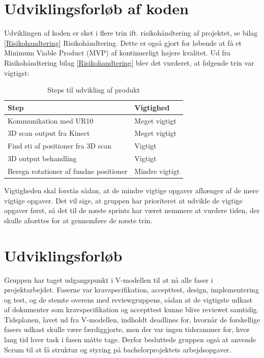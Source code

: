 \newpage

\section{Udviklingsforløb af koden}
Udviklingen af koden er sket i flere trin ift. risikohåndtering af projektet, se bilag \ref{Risikohandtering} Risikohåndtering. Dette er også gjort for løbende at få et Minimum Viable Product (MVP) af kontinuerligt højere kvalitet. 
Ud fra Risikohåndtering bilag \ref{Risikohandtering} blev det vurderet, at følgende trin var vigtigst:

\begin{table}[h]
\centering
\begin{tabular}{|l| p{}|}
\hline
\textbf{Step} &  \textbf{Vigtighed} \\\hline
	Kommunikation med UR10 & Meget vigtigt \\\hline
	3D scan output fra Kinect & Meget vigtigt\\\hline
	Find sti af positioner fra 3D scan & Vigtigt \\\hline
	3D output behandling & Vigtigt \\\hline
	Beregn rotationer af fundne positioner & Mindre vigtigt \\\hline
\end{tabular}
\caption{Steps til udvikling af produkt}
\end{table}

Vigtigheden skal forstås sådan, at de mindre vigtige opgaver afhænger af de mere vigtige opgaver. 
Det vil sige, at gruppen har prioriteret at udvikle de vigtige opgaver først, så det til de næste sprints har været nemmere at vurdere tiden, der skulle afsættes for at gennemføre de næste trin.
 
\section{Udviklingsforløb} \label{Udviklingsforlob}
Gruppen har taget udgangspunkt i V-modellen til at nå alle faser i projektarbejdet. Faserne var kravspecifikation, accepttest, design, implementering og test, og de stemte overens med reviewgruppens, sådan at de vigtigste udkast af dokumenter som kravspecifikation og accepttest kunne blive reviewet samtidig. Tidsplanen, lavet ud fra V-modellen, indholdt deadlines for, hvornår de forskellige fasers udkast skulle være færdiggjorte, men der var ingen tidsrammer for, hvor lang tid hver task i fasen måtte tage. Derfor besluttede gruppen også at anvende Scrum til at få struktur og styring på bachelorprojektets arbejdsopgaver.

